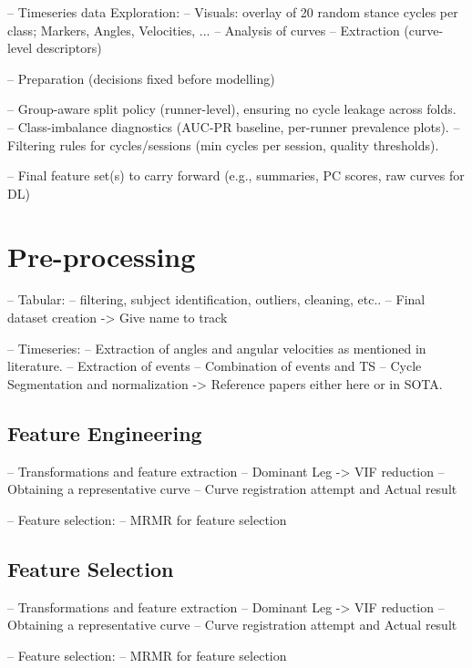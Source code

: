 -- Timeseries data Exploration:
-- Visuals: overlay of 20 random stance cycles per class; Markers, Angles, Velocities, ...
-- Analysis of curves
-- Extraction (curve-level descriptors)


-- Preparation (decisions fixed before modelling)

-- Group-aware split policy (runner-level), ensuring no cycle leakage across folds.
-- Class-imbalance diagnostics (AUC-PR baseline, per-runner prevalence plots).
-- Filtering rules for cycles/sessions (min cycles per session, quality thresholds).

-- Final feature set(s) to carry forward (e.g., summaries, PC scores, raw curves for DL)



\section{Pre-processing}\label{sec:method-preprocessing}
-- Tabular:
    -- filtering, subject identification, outliers, cleaning, etc..
    -- Final dataset creation -> Give name to track

-- Timeseries:
    -- Extraction of angles and angular velocities as mentioned in literature.
    -- Extraction of events
    -- Combination of events and TS
    -- Cycle Segmentation and normalization -> Reference papers either here or in SOTA.

\subsection{Feature Engineering}\label{subsec:method-feature-engineering}
-- Transformations and feature extraction
    -- Dominant Leg -> VIF reduction
    -- Obtaining a representative curve
        -- Curve registration attempt and Actual result

-- Feature selection:
    -- MRMR for feature selection

\subsection{Feature Selection}\label{subsec:method-feature-selection}
-- Transformations and feature extraction
    -- Dominant Leg -> VIF reduction
    -- Obtaining a representative curve
        -- Curve registration attempt and Actual result

-- Feature selection:
    -- MRMR for feature selection


